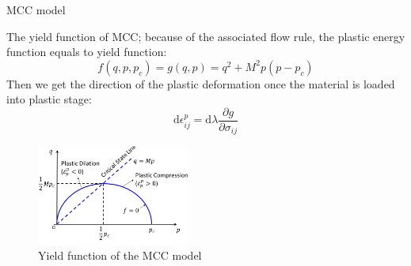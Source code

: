 \documentclass[aspectratio=169]{beamer}
\begin{document}
\begin{frame}{MCC model}
    \begin{minipage}[c]{0.55\linewidth}
        The yield function of MCC; because of the associated flow rule, the plastic energy function equals to yield function:
        \begin{equation}
            f(q, p, p_c)=g(q, p) = q^2+M^2 p(p-p_c)
            \label{eq: mcc yield function}
        \end{equation}
        Then we get the direction of the plastic deformation once the material is loaded into plastic stage:
        \begin{equation}
            \mathrm{d} \epsilon_{ij}^p=\mathrm{d}\lambda\frac{\partial g}{\partial \sigma_{ij}}
            \label{eq: plastic deformation calculation in mcc}
        \end{equation}
    \end{minipage}
    \hspace{3mm}
    \begin{minipage}[c]{0.4\linewidth}
        \centering
        \begin{figure}
            \centering
            \includegraphics[width=5cm]{./pic/yield function in p-q space.png}
            \caption{Yield function of the MCC model}
            \label{fig: yield function of the mcc model}
        \end{figure}
    \end{minipage}
\end{frame}
\end{document}
